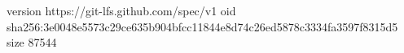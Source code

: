 version https://git-lfs.github.com/spec/v1
oid sha256:3e0048e5573c29ce635b904bfcc11844e8d74c26ed5878c3334fa3597f8315d5
size 87544
